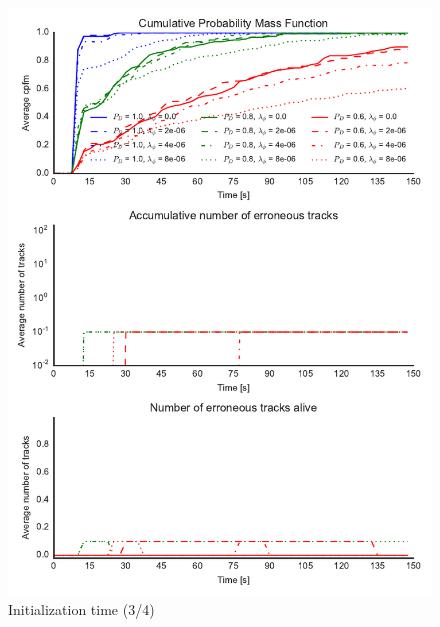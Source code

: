 \begin{figure}
\centering
\includegraphics{Figures/plots/Scenario1_Init-Time(3-4).pdf}
\caption{Initialization time (3/4)}\label{fig:init_time_3-4}
\end{figure}


